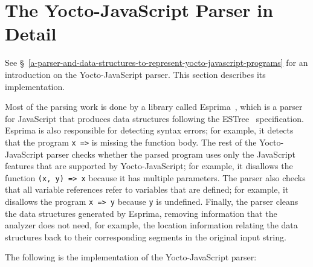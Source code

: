 \documentclass[12pt, oneside]{book}
\begin{document}

\chapter{The Yocto-JavaScript Parser in Detail}
\label{the-yocto-javascript-parser-in-detail}

See §~\ref{a-parser-and-data-structures-to-represent-yocto-javascript-programs} for an introduction on the Yocto-JavaScript parser. This section describes its implementation.

Most of the parsing work is done by a library called Esprima~\cite{esprima}, which is a parser for JavaScript that produces data structures following the ESTree~\cite{estree} specification. Esprima is also responsible for detecting syntax errors; for example, it detects that the program \texttt{x =>} is missing the function body. The rest of the Yocto-JavaScript parser checks whether the parsed program uses only the JavaScript features that are supported by Yocto-JavaScript; for example, it disallows the function \texttt{(x, y) => x} because it has multiple parameters. The parser also checks that all variable references refer to variables that are defined; for example, it disallows the program \texttt{x => y} because \texttt{y} is undefined. Finally, the parser cleans the data structures generated by Esprima, removing information that the analyzer does not need, for example, the location information relating the data structures back to their corresponding segments in the original input string.

The following is the implementation of the Yocto-JavaScript parser:
\end{document}
